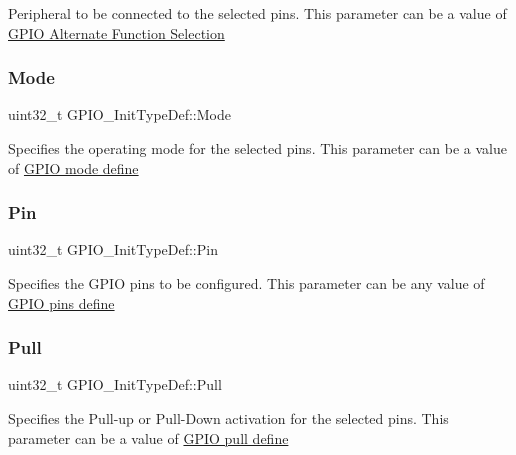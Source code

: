 Peripheral to be connected to the selected pins. This parameter can be a value of \hyperlink{group___g_p_i_o___alternate__function__selection}{G\+P\+IO Alternate Function Selection} \mbox{\label{struct_g_p_i_o___init_type_def_a3731d84343e65a98fdf51056a8d30321}} 
\subsubsection{\texorpdfstring{Mode}{Mode}}
{\footnotesize\ttfamily uint32\+\_\+t G\+P\+I\+O\+\_\+\+Init\+Type\+Def\+::\+Mode}

Specifies the operating mode for the selected pins. This parameter can be a value of \hyperlink{group___g_p_i_o__mode__define}{G\+P\+IO mode define} \mbox{\label{struct_g_p_i_o___init_type_def_aa807fb62b2b2cf937092abba81370b87}} 
\subsubsection{\texorpdfstring{Pin}{Pin}}
{\footnotesize\ttfamily uint32\+\_\+t G\+P\+I\+O\+\_\+\+Init\+Type\+Def\+::\+Pin}

Specifies the G\+P\+IO pins to be configured. This parameter can be any value of \hyperlink{group___g_p_i_o__pins__define}{G\+P\+IO pins define} \mbox{\label{struct_g_p_i_o___init_type_def_aa2d3a6b0c4e10ac20882b4a37799ced1}} 
\subsubsection{\texorpdfstring{Pull}{Pull}}
{\footnotesize\ttfamily uint32\+\_\+t G\+P\+I\+O\+\_\+\+Init\+Type\+Def\+::\+Pull}

Specifies the Pull-\/up or Pull-\/\+Down activation for the selected pins. This parameter can be a value of \hyperlink{group___g_p_i_o__pull__define}{G\+P\+IO pull define} \mbox{\label{struct_g_p_i_o___init_type_def_aae3b8ba407fb4f974cbce9cc03fc189d}} 
